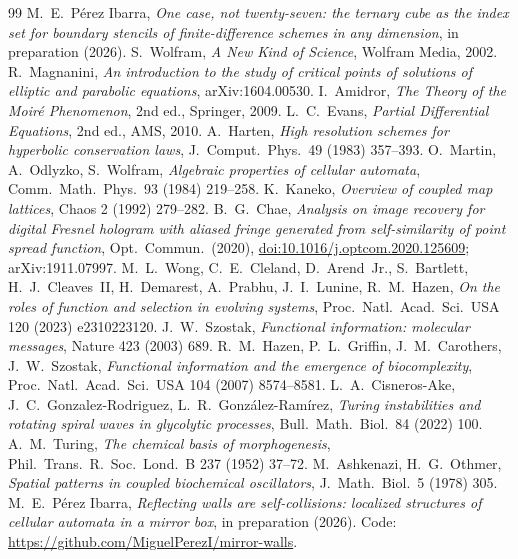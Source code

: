 \documentclass[11pt,a4paper]{article}
\theoremstyle{definition}
\theoremstyle{remark}
\begin{document}
\begin{thebibliography}{99}
M.~E.~P\'erez Ibarra,
\emph{One case, not twenty-seven: the ternary cube as the index set for
boundary stencils of finite-difference schemes in any dimension},
in preparation (2026).
S.~Wolfram, \emph{A New Kind of Science}, Wolfram Media, 2002.
R.~Magnanini, \emph{An introduction to the study of critical points of
solutions of elliptic and parabolic equations}, arXiv:1604.00530.
I.~Amidror, \emph{The Theory of the Moir\'e Phenomenon}, 2nd ed.,
Springer, 2009.
L.~C.~Evans, \emph{Partial Differential Equations}, 2nd ed., AMS, 2010.
A.~Harten, \emph{High resolution schemes for hyperbolic conservation
laws}, J.\ Comput.\ Phys.\ 49 (1983) 357--393.
O.~Martin, A.~Odlyzko, S.~Wolfram, \emph{Algebraic properties of cellular
automata}, Comm.\ Math.\ Phys.\ 93 (1984) 219--258.
K.~Kaneko, \emph{Overview of coupled map lattices}, Chaos 2 (1992) 279--282.
B.~G.~Chae, \emph{Analysis on image recovery for digital Fresnel
hologram with aliased fringe generated from self-similarity of point
spread function}, Opt.\ Commun.\ (2020),
\href{https://doi.org/10.1016/j.optcom.2020.125609}{doi:10.1016/j.optcom.2020.125609};
arXiv:1911.07997.
M.~L.~Wong, C.~E.~Cleland, D.~Arend~Jr., S.~Bartlett, H.~J.~Cleaves~II,
H.~Demarest, A.~Prabhu, J.~I.~Lunine, R.~M.~Hazen, \emph{On the roles of
function and selection in evolving systems}, Proc.\ Natl.\ Acad.\ Sci.\
USA 120 (2023) e2310223120.
J.~W.~Szostak, \emph{Functional information: molecular messages}, Nature
423 (2003) 689.
R.~M.~Hazen, P.~L.~Griffin, J.~M.~Carothers, J.~W.~Szostak,
\emph{Functional information and the emergence of biocomplexity},
Proc.\ Natl.\ Acad.\ Sci.\ USA 104 (2007) 8574--8581.
L.~A.~Cisneros-Ake, J.~C.~Gonzalez-Rodriguez, L.~R.~Gonz\'alez-Ram\'irez,
\emph{Turing instabilities and rotating spiral waves in glycolytic
processes}, Bull.\ Math.\ Biol.\ 84 (2022) 100.
A.~M.~Turing, \emph{The chemical basis of morphogenesis}, Phil.\ Trans.\
R.\ Soc.\ Lond.\ B 237 (1952) 37--72.
\bibitem{AshkenaziOthmer}
M.~Ashkenazi, H.~G.~Othmer, \emph{Spatial patterns in coupled biochemical
oscillators}, J.\ Math.\ Biol.\ 5 (1978) 305.
\bibitem{MirrorWalls}
M.~E.~P\'erez Ibarra,
\emph{Reflecting walls are self-collisions: localized structures of
cellular automata in a mirror box}, in preparation (2026). Code:
\url{https://github.com/MiguelPerezI/mirror-walls}.
\end{thebibliography}
\end{document}
